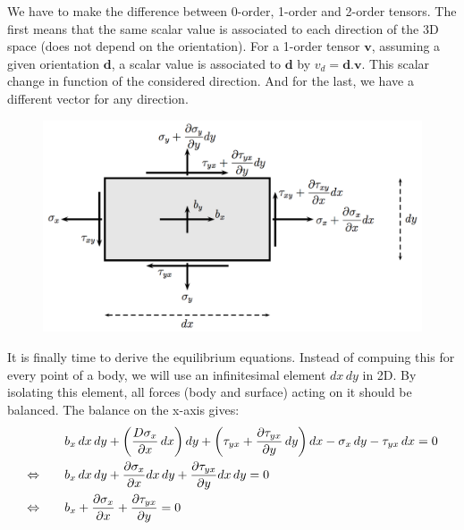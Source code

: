 		We have to make the difference between 0-order, 1-order and 2-order tensors. The first means that the same scalar value is associated to each direction of the 3D space (does not depend on the orientation). For a 1-order tensor $\bm{v}$, assuming a given orientation $\bm{d}$, a scalar value is associated to $\bm{d}$ by $v_d = \bm{d}.\bm{v}$. This scalar change in function of the considered direction. And for the last, we have a different vector for any direction. \\
		
		\begin{figure}
		\vspace{-10mm}	
		\includegraphics[scale=0.3]{ch3/4}
		\end{figure}		
		It is finally time to derive the equilibrium equations. Instead of compuing this for every point of a body, we will use an infinitesimal element $dx\, dy$ in 2D. By isolating this element, all forces (body and surface) acting on it should be balanced.  The balance on the x-axis gives:\\
		
		\begin{equation}
		\begin{aligned}
		&b_x\, dx\, dy + \left(\frac{D\sigma _x}{\partial x}\, dx\right) dy + \left( \tau _{yx} + \frac{\partial \tau _{yx}}{\partial y}\, dy \right) dx- \sigma _x \, dy - \tau _{yx}\, dx=0\\
		\Leftrightarrow \qquad &b_x \,dx \, dy + \frac{\partial \sigma_x}{\partial x}dx\, dy + \frac{\partial \tau _{yx}}{\partial y} dx \, dy =0\\
		\Leftrightarrow \qquad &b_x + \frac{\partial \sigma_x}{\partial x} + \frac{\partial \tau _{yx}}{\partial y} =0
		\end{aligned}
		\end{equation}
		
